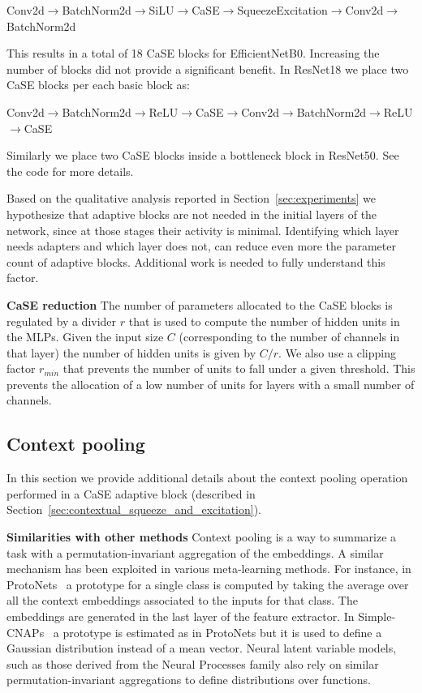 \documentclass{article}
\begin{document}
\begin{center}
Conv2d$\rightarrow$BatchNorm2d$\rightarrow$SiLU$\rightarrow$CaSE$\rightarrow$SqueezeExcitation$\rightarrow$Conv2d$\rightarrow$BatchNorm2d
\end{center}

This results in a total of 18 CaSE blocks for EfficientNetB0. Increasing the number of blocks did not provide a significant benefit. In ResNet18 we place two CaSE blocks per each basic block as: 

\begin{center}
Conv2d$\rightarrow$BatchNorm2d$\rightarrow$ReLU$\rightarrow$CaSE$\rightarrow$Conv2d$\rightarrow$BatchNorm2d$\rightarrow$ReLU$\rightarrow$CaSE
\end{center}

Similarly we place two CaSE blocks inside a bottleneck block in ResNet50. See the code for more details. 

Based on the qualitative analysis reported in Section~\ref{sec:experiments} we hypothesize that adaptive blocks are not needed in the initial layers of the network, since at those stages their activity is minimal. Identifying which layer needs adapters and which layer does not, can reduce even more the parameter count of adaptive blocks. Additional work is needed to fully understand this factor.

\textbf{CaSE reduction} The number of parameters allocated to the CaSE blocks is regulated by a divider $r$ that is used to compute the number of hidden units in the MLPs. Given the input size $C$ (corresponding to the number of channels in that layer) the number of hidden units is given by $C / r$.
We also use a clipping factor $r_{min}$ that prevents the number of units to fall under a given threshold. This prevents the allocation of a low number of units for layers with a small number of channels.


\subsection{Context pooling}

In this section we provide additional details about the context pooling operation performed in a CaSE adaptive block (described in Section~\ref{sec:contextual_squeeze_and_excitation}). 

\textbf{Similarities with other methods} Context pooling is a way to summarize a task with a permutation-invariant aggregation of the embeddings. A similar mechanism has been exploited in various meta-learning methods. For instance, in ProtoNets~\citep{snell2017prototypical} a prototype for a single class is computed by taking the average over all the context embeddings associated to the inputs for that class. The embeddings are generated in the last layer of the feature extractor. In Simple-CNAPs~\citep{bateni2020improved} a prototype is estimated as in ProtoNets but it is used to define a Gaussian distribution instead of a mean vector. Neural latent variable models, such as those derived from the Neural Processes family \citep{garnelo2018neural} also rely on similar permutation-invariant aggregations to define
distributions over functions.
\end{document}
